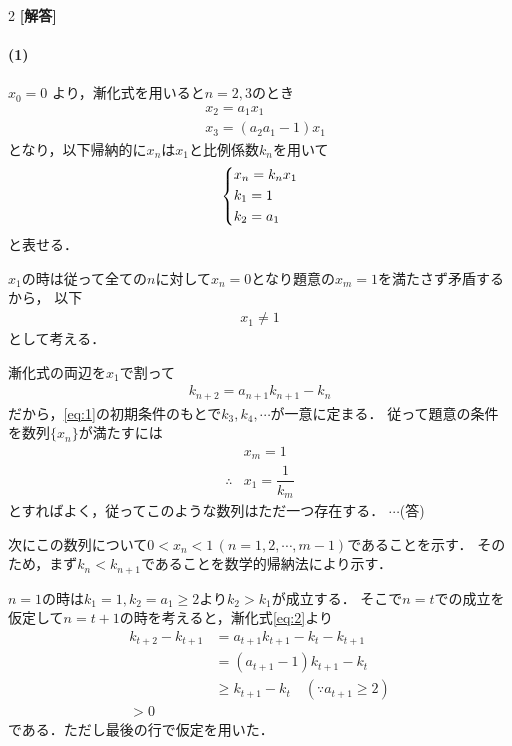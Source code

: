 \documentclass[../../main.tex]{subfiles}
\begin{document}
\setcounter{equation}{0}
\begin{oframed}
  
\end{oframed}
\setlength{\columnseprule}{0.4pt}
\begin{multicols}{2}
  {\bf [解答]}

  \paragraph{(1)}
  $x_0 = 0$ より，漸化式を用いると$n=2,3$のとき
  \begin{align}
    & x_2 = a_1 x_1           \\
    & x_3 = (a_2 a_1 - 1) x_1
  \end{align}
  となり，以下帰納的に$x_n$は$x_1$と比例係数$k_n$を用いて
  \begin{align}
    \begin{dcases}
      x_n = k_n x_1 \\
      k_1 = 1       \\
      k_2 = a_1
    \end{dcases} \label{eq:1}
  \end{align}
  と表せる．

  $x_1$の時は従って全ての$n$に対して$x_n=0$となり題意の$x_m=1$を満たさず矛盾するから，
  以下
  \begin{align}
    x_1 \neq 1
  \end{align}
  として考える．

  漸化式の両辺を$x_1$で割って
  \begin{align}
    k_{n+2} = a_{n+1} k_{n+1} - k_n \label{eq:2}
  \end{align}
  だから，\cref{eq:1}の初期条件のもとで$k_3,k_4,\cdots$が一意に定まる．
  従って題意の条件を数列$\{x_n\}$が満たすには
  \begin{align}
    & x_m = 1             \\
    \therefore
    & x_1 = \dfrac{1}{k_m}
  \end{align}
  とすればよく，従ってこのような数列はただ一つ存在する．  $\cdots$(答)

  次にこの数列について$0<x_n<1\, (n=1,2,\cdots, m-1)$であることを示す．
  そのため，まず$k_{n}<k_{n+1}$であることを数学的帰納法により示す．

  $n=1$の時は$k_1=1,k_2=a_1\ge 2$より$k_2>k_1$が成立する．
  そこで$n=t$での成立を仮定して$n=t+1$の時を考えると，漸化式\cref{eq:2}より
  \begin{align}
    k_{t+2} - k_{t+1}
    & = a_{t+1} k_{t+1} - k_t - k_{t+1}               \\
    & = \left(a_{t+1}-1\right) k_{t+1} - k_t          \\
    & \ge k_{t+1} - k_t \quad (\because a_{t+1}\ge 2) \\
    > 0
  \end{align}
  である．ただし最後の行で仮定を用いた．


\end{multicols}
\end{document}

